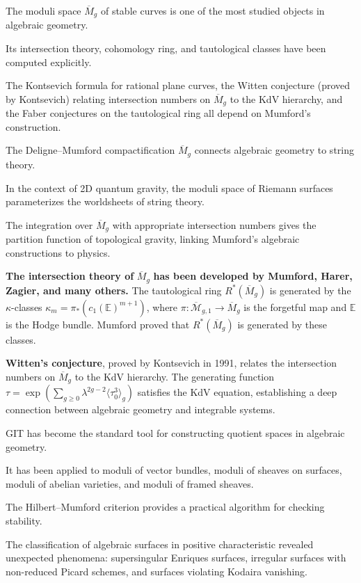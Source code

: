 The moduli space $\overline{M}_g$ of stable curves is one of the most studied objects in algebraic geometry.

Its intersection theory, cohomology ring, and tautological classes have been computed explicitly.

The Kontsevich formula for rational plane curves, the Witten conjecture (proved by Kontsevich) relating intersection numbers on $\overline{M}_g$ to the KdV hierarchy, and the Faber conjectures on the tautological ring all depend on Mumford's construction.

The Deligne--Mumford compactification $\overline{M}_g$ connects algebraic geometry to string theory.

In the context of 2D quantum gravity, the moduli space of Riemann surfaces parameterizes the worldsheets of string theory.

The integration over $\overline{M}_g$ with appropriate intersection numbers gives the partition function of topological gravity, linking Mumford's algebraic constructions to physics.

\textbf{The intersection theory of }$\overline{M}_g$ \textbf{has been developed by Mumford, Harer, Zagier, and many others.} The tautological ring $R^*(\overline{M}_g)$ is generated by the $\kappa$-classes $\kappa_m = \pi_*(c_1(\mathbb{E})^{m+1})$, where $\pi: \overline{\mathcal{M}}_{g,1} \to \overline{M}_g$ is the forgetful map and $\mathbb{E}$ is the Hodge bundle. Mumford proved that $R^*(\overline{M}_g)$ is generated by these classes.

\textbf{Witten's conjecture}, proved by Kontsevich in 1991, relates the intersection numbers on $\overline{M}_g$ to the KdV hierarchy. The generating function $\tau = \exp\left(\sum_{g \geq 0} \lambda^{2g-2} \langle \tau_0^3 \rangle_g\right)$ satisfies the KdV equation, establishing a deep connection between algebraic geometry and integrable systems.

GIT has become the standard tool for constructing quotient spaces in algebraic geometry.

It has been applied to moduli of vector bundles, moduli of sheaves on surfaces, moduli of abelian varieties, and moduli of framed sheaves.

The Hilbert--Mumford criterion provides a practical algorithm for checking stability.

The classification of algebraic surfaces in positive characteristic revealed unexpected phenomena: supersingular Enriques surfaces, irregular surfaces with non-reduced Picard schemes, and surfaces violating Kodaira vanishing.

